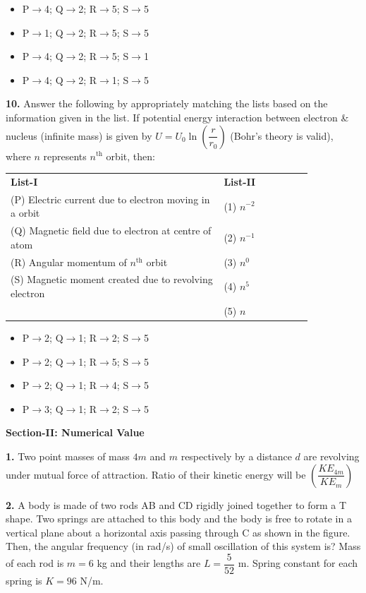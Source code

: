 \documentclass[10pt,twocolumn]{extarticle}
\newenvironment{qoptions}{\begin{itemize}[leftmargin=1.8em,itemsep=2pt,topsep=2pt,label={}]}{\end{itemize}}
\newcommand{\opt}[2]{\item[({#1})] {#2}}
\newcommand{\subsectionhdr}[1]{\par\vspace{3pt}\noindent\textbf{#1}\par\vspace{2pt}}
\begin{document}
\begin{qoptions}
\opt{A}{P$\to$4; Q$\to$2; R$\to$5; S$\to$5}
\opt{B}{P$\to$1; Q$\to$2; R$\to$5; S$\to$5}
\opt{C}{P$\to$4; Q$\to$2; R$\to$5; S$\to$1}
\opt{D}{P$\to$4; Q$\to$2; R$\to$1; S$\to$5}
\end{qoptions}

\textbf{10.} Answer the following by appropriately matching the lists based on the information given in the list. If potential energy interaction between electron \& nucleus (infinite mass) is given by $U=U_0\ln\left(\dfrac{r}{r_0}\right)$ (Bohr's theory is valid), where $n$ represents $n^{\text{th}}$ orbit, then:

\begin{center}
\begin{tabular}{@{}p{0.6\linewidth}p{0.25\linewidth}@{}}
\textbf{List-I} & \textbf{List-II} \\
(P) Electric current due to electron moving in a orbit & (1) $n^{-2}$ \\
(Q) Magnetic field due to electron at centre of atom & (2) $n^{-1}$ \\
(R) Angular momentum of $n^{\text{th}}$ orbit & (3) $n^0$ \\
(S) Magnetic moment created due to revolving electron & (4) $n^5$ \\
 & (5) $n$ \\
\end{tabular}
\end{center}

\begin{qoptions}
\opt{A}{P$\to$2; Q$\to$1; R$\to$2; S$\to$5}
\opt{B}{P$\to$2; Q$\to$1; R$\to$5; S$\to$5}
\opt{C}{P$\to$2; Q$\to$1; R$\to$4; S$\to$5}
\opt{D}{P$\to$3; Q$\to$1; R$\to$2; S$\to$5}
\end{qoptions}

\subsectionhdr{Section-II: Numerical Value}

\textbf{1.} Two point masses of mass $4m$ and $m$ respectively by a distance $d$ are revolving under mutual force of attraction. Ratio of their kinetic energy will be $\left(\dfrac{KE_{4m}}{KE_m}\right)$

\textbf{2.} A body is made of two rods AB and CD rigidly joined together to form a T shape. Two springs are attached to this body and the body is free to rotate in a vertical plane about a horizontal axis passing through C as shown in the figure. Then, the angular frequency (in rad/s) of small oscillation of this system is? Mass of each rod is $m=6$ kg and their lengths are $L=\dfrac{5}{52}$ m. Spring constant for each spring is $K=96$ N/m.
\end{document}
